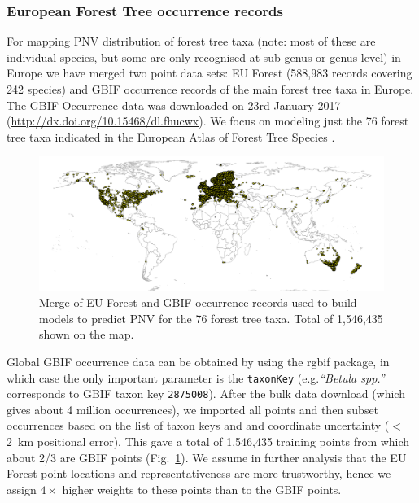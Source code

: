 \documentclass[fleqn,10pt,lineno]{wlpeerj} %
\begin{document}
\subsubsection*{European Forest Tree occurrence records}

For mapping PNV distribution of forest tree taxa (note: most of these are individual species, but some are only recognised at sub-genus or genus level) in Europe we have merged two point data sets: EU Forest \citep{mauri2017eu} (588,983 records covering 242 species) and GBIF occurrence records of the main forest tree taxa in Europe. The GBIF Occurrence data was downloaded on 23rd January 2017 (\url{http://dx.doi.org/10.15468/dl.fhucwx}). We focus on modeling just the 76 forest tree taxa indicated in the European Atlas of Forest Tree Species \citep{san2016european}. \par

\begin{figure}[ht]
\centering
\includegraphics[width=\linewidth]{Fig_3.png}
\caption{Merge of EU Forest \citep{mauri2017eu} and GBIF occurrence records used to build models to predict PNV for the 76 forest tree taxa. Total of 1,546,435 shown on the map.}
\label{Fig_EU_forest_species_worldmap}
\end{figure}

Global GBIF occurrence data can be obtained by using the \textsf{rgbif} package, in which case the only important parameter is the \verb"taxonKey" (e.g.\@ \emph{``Betula spp.''} corresponds to GBIF taxon key \texttt{2875008}). After the bulk data download (which gives about 4 million occurrences), we imported all points and then subset occurrences based on the list of taxon keys and and coordinate uncertainty ($<$\SI{2}{\kilo\meter} positional error). This gave a total of 1,546,435 training points from which about 2/3 are GBIF points (Fig.\@~\ref{Fig_EU_forest_species_worldmap}). We assume in further analysis that the EU Forest point locations and representativeness are more trustworthy, hence we assign $4\times$ higher weights to these points than to the GBIF points. \par
\end{document}

